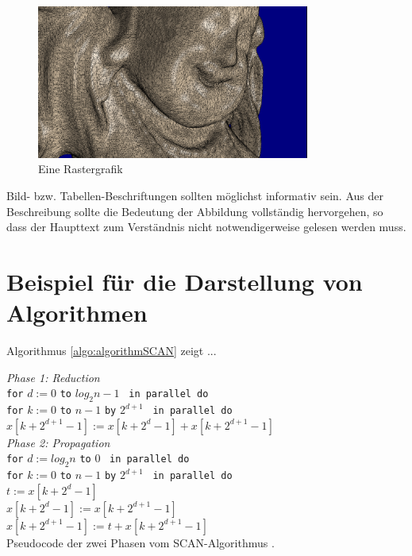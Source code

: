 \begin{figure}[htpb]
    \centering
  	\includegraphics[width=0.80\textwidth]{fig/Buddha2.png}
	\caption{Eine Rastergrafik}
	\label{fig:exampleFigure}
\end{figure}


Bild- bzw. Tabellen-Beschriftungen sollten möglichst informativ sein. Aus der Beschreibung sollte die Bedeutung der Abbildung vollständig hervorgehen, so dass der Haupttext zum Verständnis nicht notwendigerweise gelesen werden muss. 

\newpage
\section{Beispiel für die Darstellung von Algorithmen}

Algorithmus \ref{algo:algorithmSCAN} zeigt ...

\begin{algorithm}[htpb]
	\textit{Phase 1: Reduction}\\
	\texttt{for} $d := 0$ \texttt{to} $log_2 n - 1$ ~\texttt{in parallel do}\\
	\hspace{5mm}\texttt{for} $k := 0$ \texttt{to} $n - 1$ \texttt{by} $2^{d+1}$ ~\texttt{in parallel do}\\
	\hspace{10mm}$x[k + 2^{d + 1} - 1] := x[k + 2^d - 1] + x [k + 2^{d + 1} - 1]$\\
	\textit{Phase 2: Propagation}\\
	\texttt{for} $d := log_2 n$ \texttt{to} $0$ ~\texttt{in parallel do}\\
	\hspace{5mm}\texttt{for} $k := 0$ \texttt{to} $n - 1$ \texttt{by} $2^{d+1}$ ~\texttt{in parallel do}\\
	\hspace{10mm}$t := x[k + 2^d - 1]$\\
	\hspace{10mm}$x[k + 2^d - 1] := x [k + 2^{d + 1} - 1]$\\
	\hspace{10mm}$x[k + 2^{d + 1} - 1] := t + x [k + 2^{d + 1} - 1]$\\
	\caption{Pseudocode der zwei Phasen vom SCAN-Algorithmus \cite{bib:SCAN}.}
	\label{algo:algorithmSCAN}
\end{algorithm}



